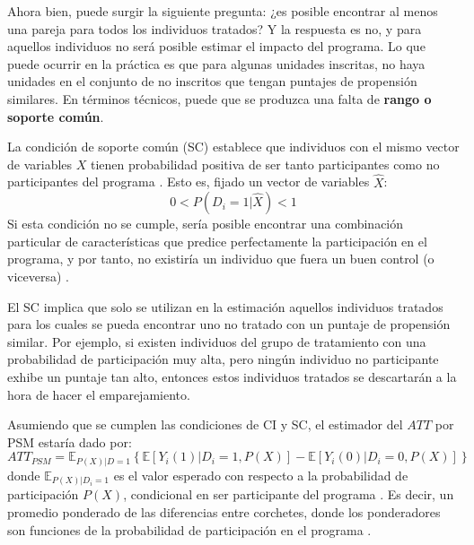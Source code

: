 \documentclass[../../main.tex]{subfiles}
\begin{document}
Ahora bien, puede surgir la siguiente pregunta: ¿es posible encontrar al menos una pareja para todos los individuos tratados? Y la respuesta es no, y para aquellos individuos no será posible estimar el impacto del programa. Lo que puede ocurrir en la práctica es que para algunas unidades inscritas, no haya unidades en el conjunto de no inscritos que tengan puntajes de propensión similares. En términos técnicos, puede que se produzca una falta de \textbf{rango o soporte común}.

La condición de soporte común (SC) establece que individuos con el mismo vector de variables \(X\) tienen probabilidad positiva de ser tanto participantes como no participantes del programa \cite{bernal}. Esto es, fijado un vector de variables \(\hat{X}\):
\[0 < P(D_i=1|\hat{X}) < 1\]
Si esta condición no se cumple, sería posible encontrar una combinación particular de características que predice perfectamente la participación en el programa, y por tanto, no existiría un individuo que fuera un buen control (o viceversa) \cite{bernal}.

El SC implica que solo se utilizan en la estimación aquellos individuos tratados para los cuales se pueda encontrar uno no tratado con un puntaje de propensión similar. Por ejemplo, si existen individuos del grupo de tratamiento con una probabilidad de participación muy alta, pero ningún individuo no participante exhibe un puntaje tan alto, entonces estos individuos tratados se descartarán a la hora de hacer el emparejamiento.

Asumiendo que se cumplen las condiciones de CI y SC, el estimador del \(ATT\) por PSM estaría dado por:
\[
ATT_{PSM} = \mathbb{E}_{P(X)|D=1}
    \left\{
        \mathbb{E}\left[Y_i(1)|D_i=1, P(X)\right] - \mathbb{E}\left[Y_i(0)|D_i=0, P(X)\right]
    \right\}
\]
donde \(\mathbb{E}_{P(X)|D_i=1}\) es el valor esperado con respecto a la probabilidad de participación \(P(X)\), condicional en ser participante del programa \cite{bernal}. Es decir, un promedio ponderado de las diferencias entre corchetes, donde los ponderadores son funciones de la probabilidad de participación en el programa \cite{bernal}.


\end{document}

